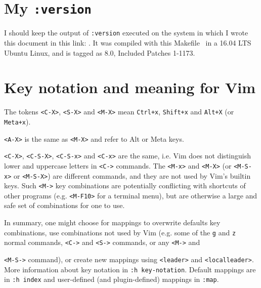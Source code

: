 \documentclass{article}
\newcommand{\ttt}[1] {
	\texttt{<#1>}}
\newcommand{\tttt}[1]{\texttt{#1}}
\begin{document}
\section{My \tttt{:version}}
I should keep the output of \tttt{:version} executed on the system
in which I wrote this document in this link:
\url{}.
It was compiled with this Makefile~\cite{makefile}
in a 16.04 LTS Ubuntu Linux,
and is tagged as 8.0, Included Patches 1-1173.

\section{Key notation and meaning for Vim}
The tokens \ttt{C-X}, \ttt{S-X} and \ttt{M-X}
mean \tttt{Ctrl+x}, \tttt{Shift+x} and \tttt{Alt+X}
(or \tttt{Meta+x}).
\ttt{A-X} is the same as \ttt{M-X} and refer to
Alt or Meta keys.
\ttt{C-X}, \ttt{C-S-X}, \ttt{C-S-x}  and \ttt{C-x} are the same,
i.e. Vim does not distinguish lower and uppercase 
letters in \ttt{C-} commands.
The \ttt{M-x} and \ttt{M-X} (or \ttt{M-S-x} or \ttt{M-S-X})
are different commands,
and they are not used by Vim's builtin keys.
Such \ttt{M-} key combinations are potentially conflicting
with shortcuts of other programs (e.g. \ttt{M-F10} for a terminal menu),
but are otherwise a large and safe set of combinations
for one to use.

In summary,
one might choose for mappings to overwrite defaults key combinations,
use combinations not used by Vim (e.g. some of the \tttt{g} and \tttt{z}
normal commands, \ttt{C-} and \ttt{S-} commands, or any \ttt{M-} and
\ttt{M-S-} command), or
create new mappings using \tttt{<leader>} and \tttt{<localleader>}.
More information about key notation in \tttt{:h key-notation}.
Default mappings are in \tttt{:h index} and user-defined (and plugin-defined) mappings
in \tttt{:map}.
\end{document}
